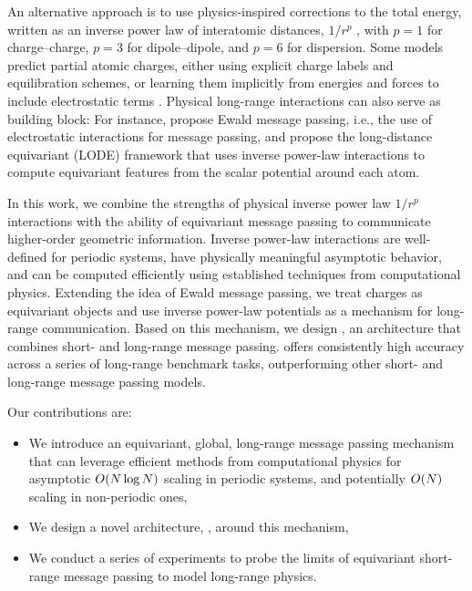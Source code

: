 \documentclass[10pt]{article} %
\newcommand{\ML}[1]{#1}
\begin{document}
An alternative approach is to use physics-inspired corrections to the total energy, written as an inverse power law of interatomic distances, $1/r^p$ , with $p=1$ for charge–charge, $p=3$ for dipole–dipole, and $p=6$ for dispersion.
Some models predict partial atomic charges, either using explicit charge labels and equilibration schemes, or learning them implicitly from energies and forces to include electrostatic terms \citep{ucgssm2021,kfgb2021,fzklsnmlbbit2022,plsk2023,mka2025,c2025}.
Physical long-range interactions can also serve as building block: For instance, \cite{kggg2023} propose Ewald message passing, i.e., the use of electrostatic interactions for message passing, and \cite{gc2019} propose the long-distance equivariant (LODE) framework that uses inverse power-law interactions to compute equivariant features \ML{from the scalar potential around each atom}.

In this work, we combine the strengths of physical inverse power law $1/r^p$ interactions with the ability of equivariant message passing to communicate higher-order geometric information. Inverse power-law interactions are well-defined for periodic systems, have physically meaningful asymptotic behavior, and can be computed efficiently using established techniques from computational physics.
Extending the idea of Ewald message passing, we treat charges as equivariant objects and use inverse power-law potentials as a mechanism for long-range communication.
Based on this mechanism, we design \lorem, an \mlp architecture that combines short- and long-range message passing.
\lorem offers consistently high accuracy across a series of long-range benchmark tasks, outperforming other short- and long-range message passing models.

Our contributions are:
\begin{itemize}
  \item We introduce an equivariant, global, long-range message passing mechanism that can leverage efficient methods from computational physics for asymptotic $O(N \log N)$ scaling in periodic systems, and potentially $O(N)$ scaling in non-periodic ones,
  \item We design a novel \mlp architecture, \lorem, around this mechanism,
  \item We conduct a series of experiments to probe the limits of equivariant short-range message passing to model long-range physics.
\end{itemize}
\end{document}
